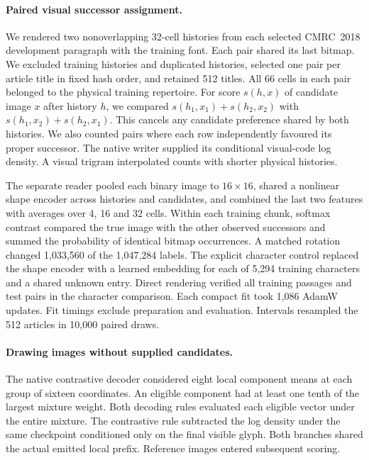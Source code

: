 \documentclass[12pt,a4paper]{article}
\providecommand{\DIFadd}[1]{{\protect\color{blue} \sf #1}} %
\begin{document}
\paragraph{\DIFadd{Paired visual successor assignment.}}
\DIFadd{We rendered two nonoverlapping 32-cell histories from each selected
CMRC~2018 development paragraph with the training font. Each pair shared
its last bitmap. We excluded training histories and duplicated histories,
selected one pair per article title in fixed hash order, and retained 512
titles. All 66 cells in each pair belonged to the physical training repertoire.
For score $s(h,x)$ of candidate image $x$ after history $h$, we compared
$s(h_1,x_1)+s(h_2,x_2)$ with $s(h_1,x_2)+s(h_2,x_1)$. This cancels
any candidate preference shared by both histories. We also counted pairs
where each row independently favoured its proper successor. The native
writer supplied its conditional visual-code log density. A visual trigram
interpolated counts with shorter physical histories.
}

\DIFadd{The separate reader pooled each binary image to $16\times16$, shared a
nonlinear shape encoder across histories and candidates, and combined the
last two features with averages over 4, 16 and 32 cells. Within each training
chunk, softmax contrast compared the true image with the other observed
successors and summed the probability of identical bitmap occurrences. A
matched rotation changed 1,033,560 of the 1,047,284 labels. The explicit
character control replaced the shape encoder with a learned embedding for
each of 5,294 training characters and a shared unknown entry. Direct
rendering verified all training passages and test pairs in the character
comparison. Each compact fit took 1,086 AdamW updates. Fit timings exclude
preparation and evaluation. Intervals resampled the 512 articles in 10,000
paired draws.
}

\paragraph{\DIFadd{Drawing images without supplied candidates.}}
\DIFadd{The native contrastive decoder considered eight local component means at
each group of sixteen coordinates. An eligible component had at least one
tenth of the largest mixture weight. Both decoding rules evaluated each
eligible vector under the entire mixture. The contrastive rule subtracted
the log density under the same checkpoint conditioned only on the final
visible glyph. Both branches shared the actual emitted local prefix.
Reference images entered subsequent scoring.
}
\end{document}
